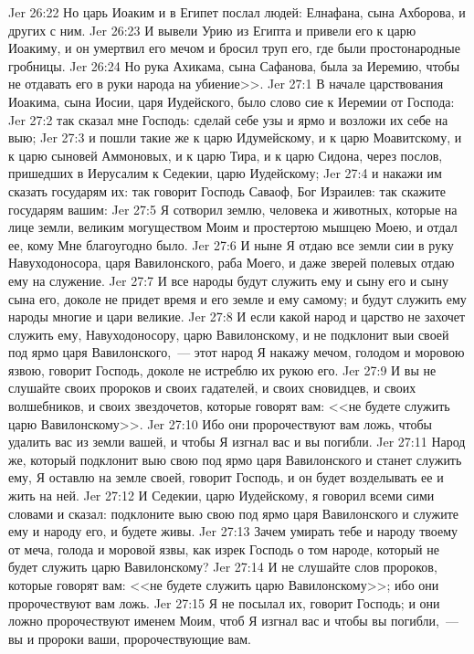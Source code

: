 \vs Jer 26:22 Но царь Иоаким и в Египет послал людей: Елнафана, сына Ахборова, и других с ним.
\vs Jer 26:23 И вывели Урию из Египта и привели его к царю Иоакиму, и он умертвил его мечом и бросил труп его, где были простонародные гробницы.
\vs Jer 26:24 Но рука Ахикама, сына Сафанова, была за Иеремию, чтобы не отдавать его в руки народа на убиение>>.
\vs Jer 27:1 В начале царствования Иоакима, сына Иосии, царя Иудейского, было слово сие к Иеремии от Господа:
\vs Jer 27:2 так сказал мне Господь: сделай себе узы и ярмо и возложи их себе на выю;
\vs Jer 27:3 и пошли такие же к царю Идумейскому, и к царю Моавитскому, и к царю сыновей Аммоновых, и к царю Тира, и к царю Сидона, через послов, пришедших в Иерусалим к Седекии, царю Иудейскому;
\vs Jer 27:4 и накажи им сказать государям их: так говорит Господь Саваоф, Бог Израилев: так скажите государям вашим:
\vs Jer 27:5 Я сотворил землю, человека и животных, которые на лице земли, великим могуществом Моим и простертою мышцею Моею, и отдал ее, кому Мне благоугодно было.
\vs Jer 27:6 И ныне Я отдаю все земли сии в руку Навуходоносора, царя Вавилонского, раба Моего, и даже зверей полевых отдаю ему на служение.
\vs Jer 27:7 И все народы будут служить ему и сыну его и сыну сына его, доколе не придет время и его земле и ему самому; и будут служить ему народы многие и цари великие.
\vs Jer 27:8 И если какой народ и царство не захочет служить ему, Навуходоносору, царю Вавилонскому, и не подклонит выи своей под ярмо царя Вавилонского,~--- этот народ Я накажу мечом, голодом и моровою язвою, говорит Господь, доколе не истреблю их рукою его.
\vs Jer 27:9 И вы не слушайте своих пророков и своих гадателей, и своих сновидцев, и своих волшебников, и своих звездочетов, которые говорят вам: <<не будете служить царю Вавилонскому>>.
\vs Jer 27:10 Ибо они пророчествуют вам ложь, чтобы удалить вас из земли вашей, и чтобы Я изгнал вас и вы погибли.
\vs Jer 27:11 Народ же, который подклонит выю свою под ярмо царя Вавилонского и станет служить ему, Я оставлю на земле своей, говорит Господь, и он будет возделывать ее и жить на ней.
\vs Jer 27:12 И Седекии, царю Иудейскому, я говорил всеми сими словами и сказал: подклоните выю свою под ярмо царя Вавилонского и служите ему и народу его, и будете живы.
\vs Jer 27:13 Зачем умирать тебе и народу твоему от меча, голода и моровой язвы, как изрек Господь о том народе, который не будет служить царю Вавилонскому?
\vs Jer 27:14 И не слушайте слов пророков, которые говорят вам: <<не будете служить царю Вавилонскому>>; ибо они пророчествуют вам ложь.
\vs Jer 27:15 Я не посылал их, говорит Господь; и они ложно пророчествуют именем Моим, чтоб Я изгнал вас и чтобы вы погибли,~--- вы и пророки ваши, пророчествующие вам.
